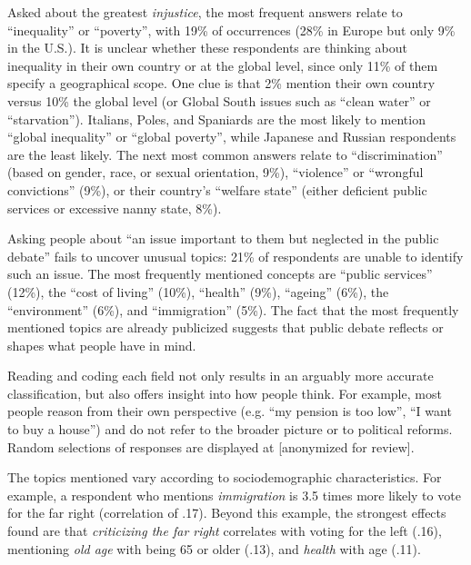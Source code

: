 \documentclass[12pt,english]{article}
\begin{document}
\begin{bibunit}
Asked about the greatest \textit{injustice}, the most frequent answers relate to ``inequality'' or ``poverty'', with 19\% of occurrences (28\% in Europe but only 9\% in the U.S.). It is unclear whether these respondents are thinking about inequality in their own country or at the global level, since only 11\% of them specify a geographical scope. One clue is that 2\% mention their own country versus 10\% the global level (or Global South issues such as ``clean water'' or ``starvation''). Italians, Poles, and Spaniards are the most likely to mention ``global inequality'' or ``global poverty'', while Japanese and Russian respondents are the least likely.
The next most common answers relate to ``discrimination'' (based on gender, race, or sexual orientation, 9\%), ``violence'' or ``wrongful convictions'' (9\%), or their country's ``welfare state'' (either deficient public services or excessive nanny state, 8\%).

Asking people about ``an issue important to them but neglected in the public debate'' fails to uncover unusual topics: 21\% of respondents are unable to identify such an issue. The most frequently mentioned concepts are ``public services'' (12\%), the ``cost of living'' (10\%), ``health'' (9\%), ``ageing'' (6\%), the ``environment'' (6\%), and ``immigration'' (5\%). The fact that the most frequently mentioned topics are already publicized suggests that public debate reflects or shapes what people have in mind.

Reading and coding each field not only results in an arguably more accurate classification, but also offers insight into how people think. For example, most people reason from their own perspective (e.g. ``my pension is too low'', ``I want to buy a house'') and do not refer to the broader picture or to political reforms. Random selections of responses are displayed at [anonymized for review]. %

The topics mentioned vary according to sociodemographic characteristics. For example, a respondent who mentions \textit{immigration} is 3.5 times more likely to vote for the far right (correlation of .17). %
Beyond this example, the strongest effects found are that \textit{criticizing the far right} correlates with voting for the left (.16), mentioning \textit{old age} with being 65 or older (.13), and \textit{health} with age (.11).


\end{bibunit}
\end{document}
